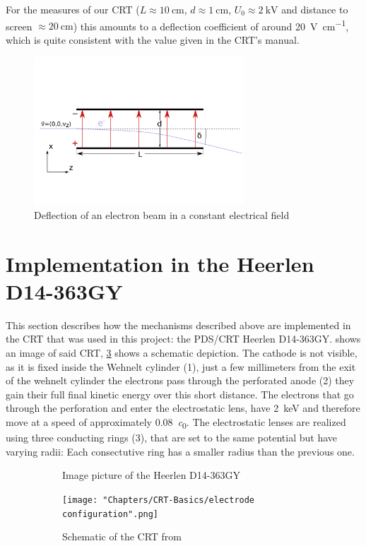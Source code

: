 For the measures of our CRT ($ L \approx \SI{10}{\centi\meter}$, $d \approx \SI{1}{\centi\meter}$, $U_0 \approx \SI{2}{\kilo\volt}$ and distance to screen $\approx \SI{20}{\centi\meter}$) this amounts to a deflection coefficient of around \SI{20}{\volt\per\centi\meter}, which is quite consistent with the value given in the CRT's manual. 

\begin{figure}
	\centering
	\includegraphics[width=0.7\textwidth]{Chapters/CRT-Basics/DeflectionPlate2}
	\caption{Deflection of an electron beam in a constant electrical field}
	\label{fig:deflectionplate2}
\end{figure}

\section{Implementation in the Heerlen D14-363GY }

This section describes how the mechanisms described above are implemented in the CRT that was used in this project: the PDS/CRT Heerlen D14-363GY.  shows an image of said CRT, \cref{fig:SchemeCRT} shows a schematic depiction. The cathode is not visible, as it is fixed inside the Wehnelt cylinder (1), just a few millimeters from the exit of the wehnelt cylinder the electrons pass through the perforated anode (2) they gain their full final kinetic energy over this short distance. The electrons that go through the perforation and enter the electrostatic lens, have \SI{2}{\kilo\electronvolt} and therefore move at a speed of approximately \SI{0.08}{\clight}. 
The electrostatic lenses are realized using three conducting rings (3), that are set to the same potential but have varying radii: Each consectutive ring has a smaller radius than the previous one. 

\begin{figure}
	\centering
	\begin{subfigure}{.5\textwidth}
		\centering
		\caption{Image picture of the Heerlen D14-363GY}
		\label{fig:FotoCRT}
	\end{subfigure}%
	\begin{subfigure}{.5\textwidth}
		\centering
		\texttt{[image: "Chapters/CRT-Basics/electrode configuration".png]}
		\caption{Schematic of the CRT from \cite{D14363GY123-manual}}
		\label{fig:SchemeCRT}
	\end{subfigure}
	\caption{}
	\label{}
\end{figure}


